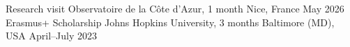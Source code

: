 
\begin{cventries}

\cventry
{Research visit} %
{Observatoire de la Côte d'Azur, 1 month} %
{Nice, France} %
{May 2026} %
{}
%
\cventry
{Erasmus+ Scholarship} %
{Johns Hopkins University, 3 months} %
{Baltimore (MD), USA} %
{April--July 2023} %
{}
%
\end{cventries}



